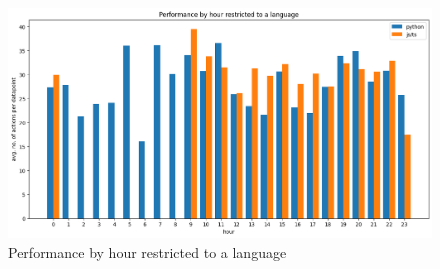\begin{figure}[htbp]
  \centering
  \includegraphics[scale=0.5]{chapters/results/graphics/performance-by-hour-langs.png}
  \caption{Performance by hour restricted to a language}
  \label{fig:performance_by_hour_langs}
\end{figure}
